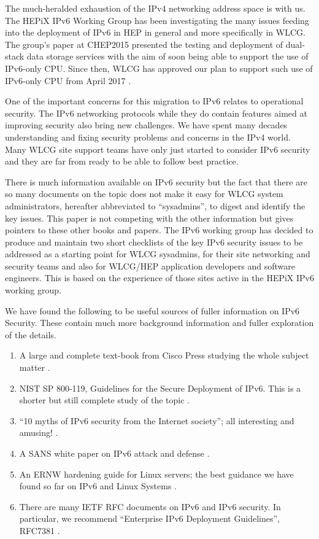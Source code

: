 
The much-heralded exhaustion of the IPv4 networking address space is with us. The HEPiX
IPv6 Working Group \cite{ipv6wg} has been investigating the many issues feeding into the deployment of IPv6 in HEP in general and more specifically in WLCG. The group's paper at CHEP2015 \cite{ipv6chep2015} presented the testing and deployment of dual-stack data storage services with the aim of soon being able to support the use of IPv6-only CPU. Since then, WLCG has approved our plan to support such use of IPv6-only CPU from April 2017 \cite{ipv6chep2016}.

One of the important concerns for this migration to IPv6 relates to operational security. The IPv6 networking protocols while they do contain features aimed at improving security also bring new challenges. We have spent many decades understanding and fixing security problems and concerns in the IPv4 world. Many WLCG site support teams have only just started to consider IPv6 security and they are far from ready to be able to follow best practice. 

There is much information available on IPv6 security but the fact that there are so many documents on the topic does not make it easy for WLCG system administrators, hereafter abbreviated to ``sysadmins'', to digest and identify the key issues. This paper is not competing with the other information but gives pointers to these other books and papers. The IPv6 working group has decided to produce and maintain two short checklists of the key IPv6 security issues to be addressed as a starting point for WLCG sysadmins, for their site networking and security teams and also for WLCG/HEP application developers and software engineers. This is based on the experience of those sites active in the HEPiX IPv6 working group.

We have found the following to be useful sources of fuller information on IPv6 Security. These contain much more background information and fuller exploration of the details.

\begin {enumerate}
\item A large and complete text-book from Cisco Press studying the whole subject matter \cite{CiscoBook}.
\item NIST SP 800-119, Guidelines for the Secure Deployment of IPv6. This is a shorter but still complete study of the topic \cite{nist800-119}.
\item ``10 myths of IPv6 security from the Internet society''; all interesting and amusing! \cite{10myths}.
\item A SANS white paper on IPv6 attack and defense \cite {SANSipv6}.
\item An ERNW hardening guide for Linux servers; the best guidance we have found so far on IPv6 and Linux Systems \cite {ERNWipv6}.
\item There are many IETF RFC documents on IPv6 and IPv6 security. In particular, we recommend ``Enterprise IPv6 Deployment Guidelines'', RFC7381 \cite{rfc}.
\end {enumerate}

